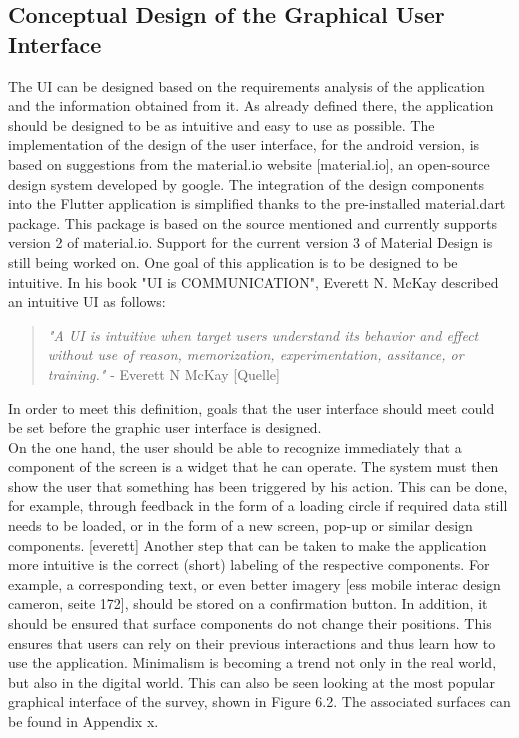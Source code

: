 \subsection{Conceptual Design of the Graphical User Interface}
The UI can be designed based on the requirements analysis of the application and the information obtained from it. As already defined there, the application should be designed to be as intuitive and easy to use as possible. The implementation of the design of the user interface, for the android version, is based on suggestions from the material.io website [material.io], an open-source design system developed by google. The integration of the design components into the Flutter application is simplified thanks to the pre-installed material.dart package. This package is based on the source mentioned and currently supports version 2 of material.io. Support for the current version 3 of Material Design is still being worked on.
\noindent
One goal of this application is to be designed to be intuitive. In his book "UI is COMMUNICATION", Everett N. McKay described an intuitive UI as follows: 
\begin{quote}
	\textit{"A UI is intuitive when target users understand its behavior and effect without use of reason, memorization, experimentation, assitance, or training."} - Everett N McKay [Quelle]
\end{quote}
In order to meet this definition, goals that the user interface should meet could be set before the graphic user interface is designed.\\
\noindent
On the one hand, the user should be able to recognize immediately that a component of the screen is a widget that he can operate. The system must then show the user that something has been triggered by his action. This can be done, for example, through feedback in the form of a loading circle if required data still needs to be loaded, or in the form of a new screen, pop-up or similar design components. [everett] Another step that can be taken to make the application more intuitive is the correct (short) labeling of the respective components. For example, a corresponding text, or even better imagery [ess mobile interac design cameron, seite 172], should be stored on a confirmation button. In addition, it should be ensured that surface components do not change their positions. This ensures that users can rely on their previous interactions and thus learn how to use the application. Minimalism is becoming a trend not only in the real world, but also in the digital world. This can also be seen looking at the most popular graphical interface of the survey, shown in Figure 6.2. The associated surfaces can be found in Appendix x.
